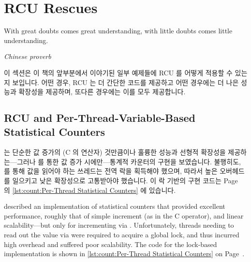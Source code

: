 
\section{RCU Rescues}
\label{sec:together:RCU Rescues}
%
\epigraph{With great doubts comes great understanding, with little doubts
	  comes little understanding.}
	 {\emph{Chinese proverb}}

이 섹션은 이 책의 앞부분에서 이야기된 일부 예제들에 RCU 를 어떻게 적용할 수
있는지 보입니다.
어떤 경우, RCU 는 더 간단한 코드를 제공하고 어떤 경우에는 더 나은 성능과
확장성을 제공하며, 또다른 경우에는 이를 모두 제공합니다.

\iffalse

This section shows how to apply RCU to some examples discussed earlier
in this book.
In some cases, RCU provides simpler code, in other cases better
performance and scalability, and in still other cases, both.

\fi

\subsection{RCU and Per-Thread-Variable-Based Statistical Counters}
\label{sec:together:RCU and Per-Thread-Variable-Based Statistical Counters}

는 단순한 값 증가의 (C 의 \co{++} 연산자) 것만큼이나 훌륭한 성능과 선형적
확장성을 제공하는---그러나  를 통한 값 증가 시에만---통계적
카운터의 구현을 보였습니다.
불행히도,  를 통해 값을 읽어야 하는 쓰레드는 전역 락을
획득해야 했으며, 따라서 높은 오버헤드를 일으키고 낮은 확장성으로 고통받아야
했습니다.
이 락 기반의 구현 코드는
Page~\pageref{lst:count:Per-Thread Statistical Counters} 의
\cref{lst:count:Per-Thread Statistical Counters} 에 있습니다.

\iffalse

described an implementation of statistical counters that provided
excellent
performance, roughly that of simple increment (as in the C \co{++}
operator), and linear scalability---but only for incrementing
via .
Unfortunately, threads needing to read out the value via 
were required to acquire a global
lock, and thus incurred high overhead and suffered poor scalability.
The code for the lock-based implementation is shown in
\cref{lst:count:Per-Thread Statistical Counters} on
Page~\pageref{lst:count:Per-Thread Statistical Counters}.

